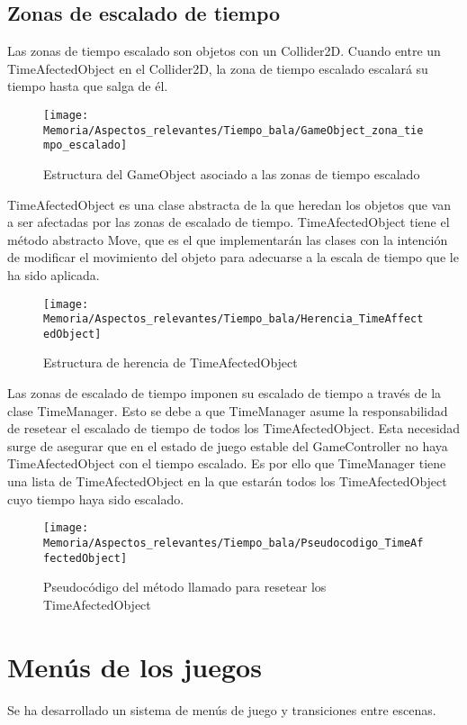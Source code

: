 \subsection{Zonas de escalado de tiempo}
Las zonas de tiempo escalado son objetos con un Collider2D. Cuando entre un TimeAfectedObject en el Collider2D, la zona de tiempo escalado escalará su tiempo hasta que salga de él.

\begin{figure}[h]
\texttt{[image: Memoria/Aspectos\_relevantes/Tiempo\_bala/GameObject\_zona\_tiempo\_escalado]}
\caption{Estructura del GameObject asociado a las zonas de tiempo escalado}
\end{figure}

TimeAfectedObject es una clase abstracta de la que heredan los objetos que van a ser afectadas por las zonas de escalado de tiempo. TimeAfectedObject tiene el método abstracto Move, que es el que implementarán las clases con la intención de modificar el movimiento del objeto para adecuarse a la escala de tiempo que le ha sido aplicada.

\clearpage
\begin{figure}[h]
\texttt{[image: Memoria/Aspectos\_relevantes/Tiempo\_bala/Herencia\_TimeAffectedObject]}
\caption{Estructura de herencia de TimeAfectedObject}
\end{figure}

Las zonas de escalado de tiempo imponen su escalado de tiempo a través de la clase TimeManager. Esto se debe a que TimeManager asume la responsabilidad de resetear el escalado de tiempo de todos los TimeAfectedObject. Esta necesidad surge de asegurar que en el estado de juego estable del GameController no haya TimeAfectedObject con el tiempo escalado. Es por ello que TimeManager tiene una lista de TimeAfectedObject en la que estarán todos los TimeAfectedObject cuyo tiempo haya sido escalado.

\begin{figure}[h]
\texttt{[image: Memoria/Aspectos\_relevantes/Tiempo\_bala/Pseudocodigo\_TimeAffectedObject]}
\caption{Pseudocódigo del método llamado para resetear los TimeAfectedObject}
\end{figure}

\section{Menús de los juegos}
Se ha desarrollado un sistema de menús de juego y transiciones entre escenas.

